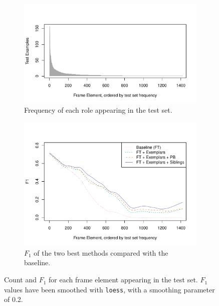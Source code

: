 \documentclass[11pt,a4paper]{article}
\newcommand{\ensuretext}[1]{#1}
\newcommand{\nssmarker}{\ensuretext{\textcolor{magenta}{\ensuremath{^{\textsc{NS}}_{\textsc{S}}}}}}
\newcommand{\arkcomment}[3]{\ensuretext{\textcolor{#3}{[#1 #2]}}}
\newcommand{\nss}[1]{\arkcomment{\nssmarker}{#1}{magenta}}
\newcommand{\finalversion}[1]{}
\begin{document}
\begin{figure}[t]
	\begin{subfigure}[b]{0.5\textwidth}
		\includegraphics[width=\textwidth]{fig/num_instances}
		\caption{Frequency of each role appearing in the test set.}\label{fig:num_inst}
	\end{subfigure}
	\begin{subfigure}[b]{0.5\textwidth}
		\vspace{-1cm}
		\includegraphics[width=\textwidth]{fig/f1_sorted_by_num_instances}
		\caption{$F_1$ of the two best methods compared with the baseline.}\label{fig:coolplot}
	\end{subfigure}
	\caption{Count and $F_1$ for each frame element appearing in the test set. $F_1$ values have been smoothed with \texttt{loess}, with a smoothing parameter of 0.2.}
\end{figure}

\finalversion{\nss{impact of automatic frames?}}
\end{document}
